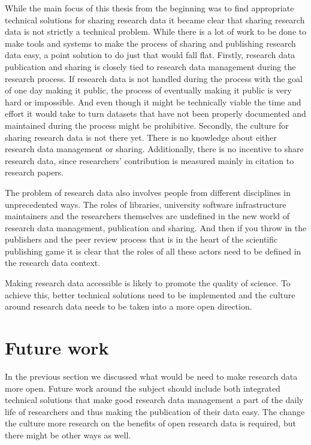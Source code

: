 While the main focus of this thesis from the beginning was to find
appropriate technical solutions for sharing research data it became clear
that sharing research data is not strictly a technical problem. While there is
a lot of work to be done to make tools and systems to make the process of
sharing and publishing research data easy, a point solution to do just that
would fall flat. Firstly, research data publication and sharing is closely
tied to research data management during the research process. If research data
is not handled during the process with the goal of one day making it public,
the process of eventually making it public is very hard or impossible. And even
though it might be technically viable the time and effort it would take to
turn datasets that have not been properly documented and maintained during the
process might be prohibitive. Secondly, the culture for sharing research data
is not there yet. There is no knowledge about either research data management
or sharing. Additionally, there is no incentive to share research data, since
researchers' contribution is measured mainly in citation to research papers.

The problem of research data also involves people from different disciplines
in unprecedented ways. The roles of libraries, university software
infrastructure maintainers and the researchers themselves are undefined in
the new world of research data management, publication and sharing. And then
if you throw in the publishers and the peer review process that is in the
heart of the scientific publishing game it is clear that the roles of all
these actors need to be defined in the research data context.

Making research data accessible is likely to promote the quality of science.
To achieve this, better technical solutions need to be implemented and the
culture around research data needs to be taken into a more open direction.

\section{Future work}

In the previous section we discussed what would be need to make research data
more open. Future work around the subject should include both integrated
technical solutions that make good research data management a part of the
daily life of researchers and thus making the publication of their data easy.
The change the culture more research on the benefits of open research data
is required, but there might be other ways as well.


